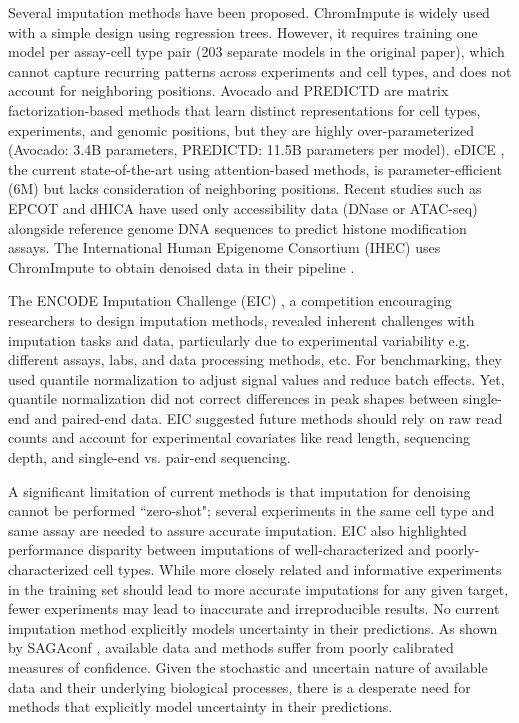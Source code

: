 \documentclass[twoside,11pt]{article}
\begin{document}
Several imputation methods have been proposed. ChromImpute \cite{ernst2015large} is widely used with a simple design using regression trees. However, it requires training one model per assay-cell type pair (203 separate models in the original paper), which cannot capture recurring patterns across experiments and cell types, and does not account for neighboring positions. Avocado \cite{schreiber2020avocado} and PREDICTD \cite{durham2018predictd} are matrix factorization-based methods that learn distinct representations for cell types, experiments, and genomic positions, but they are highly over-parameterized (Avocado: 3.4B parameters, PREDICTD: 11.5B parameters per model). eDICE \cite{hawkins2023getting}, the current state-of-the-art using attention-based methods, is parameter-efficient (6M) but lacks consideration of neighboring positions. Recent studies such as EPCOT \cite{zhang2023generalizable} and dHICA \cite{wen2024discriminative} have used only accessibility data (DNase or ATAC-seq) alongside reference genome DNA sequences to predict histone modification assays. The International Human Epigenome Consortium (IHEC) uses ChromImpute to obtain denoised data in their pipeline \cite{bujold2016international}.

The ENCODE Imputation Challenge (EIC) \cite{schreiber2023encode}, a competition encouraging researchers to design  imputation methods, revealed inherent challenges with imputation tasks and data, particularly due to experimental variability e.g. different assays, labs, and data processing methods, etc. For benchmarking, they used quantile normalization to adjust signal values and reduce batch effects. Yet, quantile normalization did not correct differences in peak shapes between single-end and paired-end data. EIC suggested future methods should rely on raw read counts and account for experimental covariates like read length, sequencing depth, and single-end vs. pair-end sequencing.

A significant limitation of current methods is that imputation for denoising cannot be performed ``zero-shot"; several experiments in the same cell type and same assay are needed to assure accurate imputation. EIC \cite{schreiber2023encode} also highlighted performance disparity between imputations of well-characterized and poorly-characterized cell types. While more closely related and informative experiments in the training set should lead to more accurate imputations for any given target, fewer experiments may lead to inaccurate and irreproducible results. No current imputation method explicitly models uncertainty in their predictions. As shown by SAGAconf \cite{shahraki2024robust}, available data and methods suffer from poorly calibrated measures of confidence. Given the stochastic and uncertain nature of available data and their underlying biological processes, there is a desperate need for methods that explicitly model uncertainty in their predictions.
\end{document}
